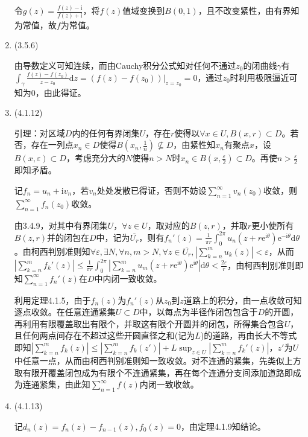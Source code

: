 \documentclass[a4paper,UTF8,fontset=windows]{ctexart}
\begin{document}
\begin{enumerate}
    令$g(z)=\frac{f(z)-\mathrm{i}}{f(z)+\mathrm{i}}$，将$f(z)$值域变换到$B(0,1)$，且不改变紧性，由有界知为常值，故$f$为常值。
    
    \item (3.5.6)
    
    由导数定义可知连续，而由Cauchy积分公式知对任何不通过$z_0$的闭曲线$\gamma$有$\int_\gamma\frac{f(z)-f(z_0)}{z-z_0}\mathrm{d}z=(f(z)-f(z_0))|_{z=z_0}=0$，通过$z_0$时利用极限逼近可知为0，由此得证。
    
    \item (4.1.12)
    
    引理：对区域$D$内的任何有界闭集$U$，存在$r$使得以$\forall x\in U,B(x,r)\subset D$。若否，存在一列点$x_n\in D$使得$B(x_n,\frac{1}{n})\nsubseteq D$，由紧性知$x_n$有聚点$x$，设$B(x,\varepsilon)\subset D$，考虑充分大的$N$使得$n>N$时$x_n\in B(x,\frac{\varepsilon}{2})\subset D$。再使$n>\frac{\varepsilon}{2}$即知矛盾。
    
    记$f_n=u_n+\mathrm{i}v_n$，若$v_n$处处发散已得证，否则不妨设$\sum_{n=1}^\infty v_n(z_0)$收敛，则$\sum_{n=1}^\infty f_n(z_0)$收敛。
    
    由3.4.9，对其中有界闭集$U$，$\forall z\in U$，取对应的$B(z,r)$，并取$r$更小使所有$B(z,r)$并的闭包在$D$中，记为$\overline{U_r}$，则有$f_n'(z)=\frac{1}{\pi r}\int_0^{2\pi}u_n(z+r\mathrm{e}^{\mathrm{i}\theta})\mathrm{e}^{-\mathrm{i}\theta}\mathrm{d}\theta$。由柯西判别准则知$\forall\varepsilon,\exists N,\forall n,m>N,\forall z\in \overline{U_r},|\sum_{k=n}^mu_k(z)|<\varepsilon$，从而$|\sum_{k=n}^mf_k'(z)|\le\frac{1}{\pi r}\int_0^{2\pi}|\sum_{k=n}^mu_m(z+r\mathrm{e}^{\mathrm{i}\theta})\mathrm{e}^{\mathrm{i}\theta}|\mathrm{d}\theta<\frac{2\varepsilon}{r}$，由柯西判别准则即知$\sum_{n=1}^\infty f_n'(z)$在$D$中内闭一致收敛。
    
    利用定理4.1.5，由于$f_n(z)$为$f_n'(z)$从$z_0$到$z$道路上的积分，由一点收敛可知逐点收敛。在任意连通紧集$U\subset D$中，以每点为半径作闭包包含于$D$的开圆，再利用有限覆盖取出有限个，并取这有限个开圆并的闭包，所得集合包含$U$，且任何两点间存在不超过这些开圆直径之和(记为$L$)的道路，再由长大不等式即知$|\sum_{k=n}^mf_k(z)|\le|\sum_{k=n}^mf_k(z')|+L\sup_{z\in U}|\sum_{k=n}^mf_k'(z)|$，$z'$为$U$中任意一点，从而由柯西判别准则知一致收敛。对不连通的紧集，先类似上方取有限开覆盖闭包成为有限个不连通紧集，再在每个连通分支间添加道路即成为连通紧集，由此知$\sum_{n=1}^\infty f(z)$内闭一致收敛。
    
    \item (4.1.13)
    
    记$d_n(z)=f_n(z)-f_{n-1}(z),f_0(z)=0$，由定理4.1.9知结论。
    

\end{enumerate}
\end{document}
